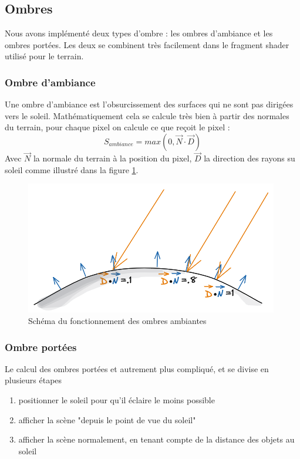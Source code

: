 \documentclass[11pt]{article} %
\begin{document}

\subsection{Ombres}

Nous avons implémenté deux types d'ombre : les ombres d'ambiance et les ombres portées. Les deux se combinent très facilement dans le fragment shader utilisé pour le terrain.
\subsubsection{Ombre d'ambiance}
Une ombre d'ambiance est l'obsurcissement des surfaces qui ne sont pas dirigées vers le soleil. Mathématiquement cela se calcule très bien à partir des normales du terrain, pour chaque pixel on calcule ce que reçoit le pixel :
$$ S_{ambiance}=max(0, \vec{N}\cdot \vec{D}) $$
Avec $\vec{N}$ la normale du terrain à la position du pixel, $\vec{D}$ la direction des rayons su soleil comme illustré dans la figure \ref{fig:ambiant_shadows_schema}.

\begin{figure}[h]
	\centering
	\includegraphics[scale=.49]{ombres_ambiantes}
	\caption{Schéma du fonctionnement des ombres ambiantes}
	\label{fig:ambiant_shadows_schema}
\end{figure}

\subsubsection{Ombre portées}
\label{sec:casted_shadows}
Le calcul des ombres portées et autrement plus compliqué, et se divise en plusieurs étapes
\begin{enumerate}
\itemsep-.5em
\item positionner le soleil pour qu'il éclaire le moins possible
\item afficher la scène "depuis le point de vue du soleil"
\item afficher la scène normalement, en tenant compte de la distance des objets au soleil
\end{enumerate}
\end{document}
